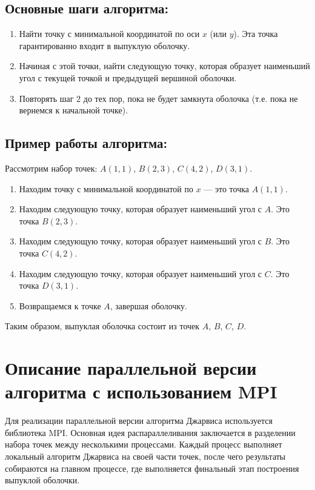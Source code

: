 \documentclass[12pt]{article}
\begin{document}
\subsection*{Основные шаги алгоритма:}
\begin{enumerate}
    \item Найти точку с минимальной координатой по оси \( x \) (или \( y \)). Эта точка гарантированно входит в выпуклую оболочку.
    \item Начиная с этой точки, найти следующую точку, которая образует наименьший угол с текущей точкой и предыдущей вершиной оболочки.
    \item Повторять шаг 2 до тех пор, пока не будет замкнута оболочка (т.е. пока не вернемся к начальной точке).
\end{enumerate}

\subsection*{Пример работы алгоритма:}
Рассмотрим набор точек: \( A(1, 1) \), \( B(2, 3) \), \( C(4, 2) \), \( D(3, 1) \).

\begin{enumerate}
    \item Находим точку с минимальной координатой по \( x \) — это точка \( A(1, 1) \).
    \item Находим следующую точку, которая образует наименьший угол с \( A \). Это точка \( B(2, 3) \).
    \item Находим следующую точку, которая образует наименьший угол с \( B \). Это точка \( C(4, 2) \).
    \item Находим следующую точку, которая образует наименьший угол с \( C \). Это точка \( D(3, 1) \).
    \item Возвращаемся к точке \( A \), завершая оболочку.
\end{enumerate}

Таким образом, выпуклая оболочка состоит из точек \( A \), \( B \), \( C \), \( D \).

\section*{Описание параллельной версии алгоритма с использованием MPI}
Для реализации параллельной версии алгоритма Джарвиса используется библиотека MPI. Основная идея распараллеливания заключается в разделении набора точек между несколькими процессами. Каждый процесс выполняет локальный алгоритм Джарвиса на своей части точек, после чего результаты собираются на главном процессе, где выполняется финальный этап построения выпуклой оболочки.
\end{document}
